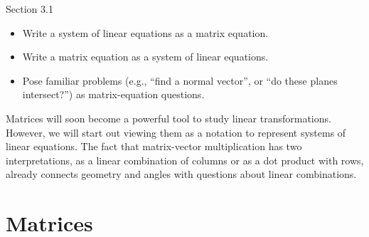 \documentclass{problemset}
\begin{document}
\begin{lesson}
	\newpage

	Section 3.1

	\begin{itemize}
		\item Write a system of linear equations as a matrix equation.
		\item Write a matrix equation as a system of linear equations.
		\item Pose familiar problems (e.g., ``find a normal vector'', or 
			``do these planes intersect\mbox{?}'') as matrix-equation
			questions.
	\end{itemize}

	Matrices will soon become a powerful tool to study linear transformations.
	However, we will start out viewing them as a notation to represent
	systems of linear equations. The fact that matrix-vector multiplication
	has two interpretations, as a linear combination of columns or as a dot product
	with rows, already connects geometry and angles with questions about linear combinations.

	\newpage
\end{lesson}
\section*{Matrices}
	
\end{document}
